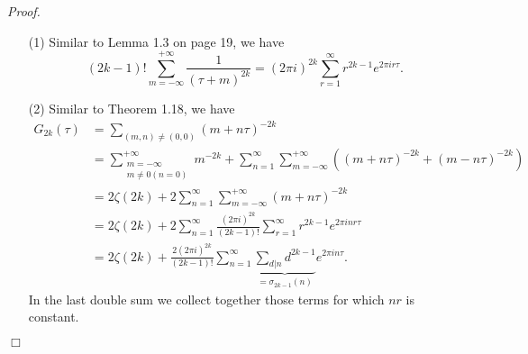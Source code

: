 \documentclass{article}
\begin{document}
\emph{Proof.}
\begin{enumerate}
\item[(1)]
  Similar to Lemma 1.3 on page 19, we have
  \[
    (2k-1)! \sum_{m=-\infty}^{+\infty} \frac{1}{(\tau+m)^{2k}}
    = (2 \pi i)^{2k} \sum_{r=1}^{\infty} r^{2k-1} e^{2 \pi i r \tau}.
  \]

\item[(2)]
  Similar to Theorem 1.18, we have
  \begin{align*}
    G_{2k}(\tau)
    &= \sum_{(m,n) \neq (0,0)} (m+n\tau)^{-2k} \\
    &= \sum_{\substack{m=-\infty \\ m \neq 0 (n = 0)}}^{+\infty} m^{-2k}
      + \sum_{n=1}^{\infty} \sum_{m=-\infty}^{+\infty} ((m+n\tau)^{-2k} + (m-n\tau)^{-2k}) \\
    &= 2 \zeta(2k)
      + 2 \sum_{n=1}^{\infty} \sum_{m=-\infty}^{+\infty} (m+n\tau)^{-2k} \\
    &= 2 \zeta(2k)
      + 2 \sum_{n=1}^{\infty} \frac{(2\pi i)^{2k}}{(2k-1)!}
        \sum_{r=1}^{\infty} r^{2k-1} e^{2\pi i nr \tau} \\
    &= 2 \zeta(2k)
      + \frac{2(2\pi i)^{2k}}{(2k-1)!} \sum_{n=1}^{\infty}
        \underbrace{\sum_{d|n} d^{2k-1}}_{= \sigma_{2k-1}(n)} e^{2\pi i n \tau}.
  \end{align*}
  In the last double sum we collect together those terms for which $nr$ is constant.
\end{enumerate}
$\Box$ \\\\



\end{document}
